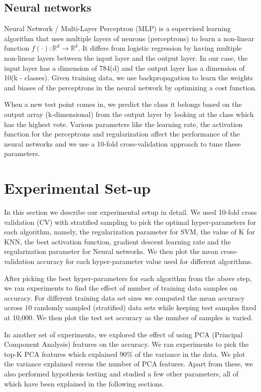 \documentclass[10pt]{scrartcl}
\begin{document}
\subsection*{Neural networks}
Neural Network / Multi-Layer Perceptron (MLP) is a supervised learning algorithm that uses multiple layers of neurons (perceptrons) to learn a non-linear function $f(\cdot):\mathbb{R}^{d} \rightarrow \mathbb{R}^{k}$. It differs from logistic regression by having multiple non-linear layers between the input layer and the output layer. In our case, the input layer has a dimension of 784(d) and the output layer has a dimension of 10(k - classes). Given training data, we use backpropagation to learn the weights and biases of the perceptrons in the neural network by optimizing a cost function.

When a new test point comes in, we predict the class it belongs based on the output array (k-dimensional) from the output layer by looking at the class which has the highest vote. Various parameters like the learning rate, the activation function for the perceptrons and regularization affect the performance of the neural networks and we use a 10-fold cross-validation approach to tune these parameters. 

\section*{Experimental Set-up}
In this section we describe our experimental setup in detail.
We used 10-fold cross validation (CV) with stratified sampling to pick the optimal hyper-parameters for each algorithm, namely, 
the regularization parameter for SVM, the value of K for KNN, the best activation function, gradient descent learning rate and the regularization parameter for Neural networks. We then plot the mean cross-validation accuracy for each hyper-parameter value used for different algorithms.

After picking the best hyper-parameters for each algorithm from the above step, we ran experiments to find the effect of number of training data samples on accuracy. 
For different training data set sizes we computed the mean accuracy across $10$ randomly sampled (stratified) data sets
while keeping test samples fixed at 10,000. We then plot the test set accuracy as the number of samples is varied.

In another set of experiments, we explored the effect of using PCA (Principal Component Analysis) features on the accuracy.
We ran experiments to pick the top-K PCA features which explained 90\% of the variance in the data. We plot the variance explained
versus the number of PCA features. Apart from these, we also performed hypothesis testing and studied a few other parameters, all of which have been explained in the following sections.
\end{document}
